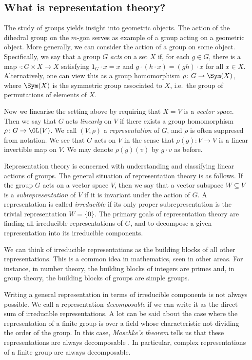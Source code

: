 
\subsection*{What is representation theory?}
The study of groups yields insight into geometric objects.
The action of the dihedral group on the $m$-gon serves as example of a group acting on a geometric object.
More generally, we can consider the action of a group on some object.
Specifically, we say that a group $G$ \emph{acts} on a set $X$ if, for each $g\in G$, there is a map $\cdot\colon G\times X\to X$ satisfying $1_G\cdot x = x$ and $g\cdot (h\cdot x) = (gh)\cdot x$ for all $x\in X$.
Alternatively, one can view this as a group homomorphism $\rho\colon G\to \Sym(X)$, where $\Sym(X)$ is the symmetric group associated to $X$, i.e.\ the group of permutations of elements of $X$.

Now we linearise the setting above by requiring that $X=V$ is a \emph{vector space}.
Then we say that $G$ acts \emph{linearly} on $V$ if there exists a group homomorphism $\rho\colon G\to \GL(V)$.
We call $(V,\rho)$ a \emph{representation} of $G$, and $\rho$ is often suppresed from notation.
We see that $G$ acts on $V$ in the sense that $\rho(g)\colon V\to V$ is a linear invertible map on $V$.
We may denote $\rho(g)(v)$ by $g\cdot v$ as before.

Representation theory is concerned with understanding and classifying linear actions of groups.
The general situation of representation theory is as follows.
If the group $G$ acts on a vector space $V$, then we say that a vector subspace $W\subseteq V$ is a \emph{subrepresentation} of $V$ if it is invariant under the action of $G$.
A representation is called \emph{irreducible} if its only proper subrepresentation is the trivial representation $W=\{0\}$.
The primary goals of representation theory are finding all irreducible representations of $G$, and to decompose a given representation into its irreducible components.

We can think of irreducible representations as the building blocks of all other representations.
This is a common idea in mathematics, seen in other areas.
For instance, in number theory, the building blocks of integers are primes and, in group theory, the building blocks of groups are simple groups.

Writing a general representation in terms of irreducible components is not always possible.
We call a representation \emph{decomposable} if we can write it as the direct sum of irreducible representations.
A lot can be said about the case where the representation of a finite group is over a field whose characteristic not dividing the order of the group.
In this case, \emph{Maschke's theorem} tells us that these representations are always decomposable \cite{Lang02}.
In particular, complex representations of a finite group are always decomposable.

